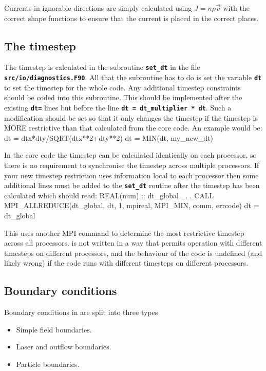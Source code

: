 \documentclass[12pt,a4paper]{article}
\newcommand{\inlinecode}[1]{{\color{warwickred} \bf\texttt{#1}}}
\newcommand{\EPOCH}{{\color{warwickdark}\fontfamily{phv}\selectfont{EPOCH}}}
\newenvironment{boxverbatim}{\lboxverbatim{none}}{\endlboxverbatim}
\begin{document}
Currents in ignorable directions are simply calculated using $J = n\rho\vec{v}$
with the correct shape functions to ensure that the current is placed in the
correct places.

\subsection{The timestep}

The timestep is calculated in the subroutine \inlinecode{set\_dt} in the file
\inlinecode{src/io/diagnostics.F90}. All that the subroutine has to do is set
the variable \inlinecode{dt} to set the timestep for the whole code. Any
additional timestep constraints should be coded into this subroutine. This
should be implemented after the existing \inlinecode{dt=} lines but before the
line \inlinecode{dt = dt\_multiplier * dt}. Such a modification should be set so
that it only changes the timestep if the timestep is MORE restrictive than that
calculated from the core code. An example would be:
\begin{boxverbatim}
   dt = dtx*dty/SQRT(dtx**2+dty**2)
   dt = MIN(dt, my_new_dt)
\end{boxverbatim}

In the core {\EPOCH} code the timestep can be calculated identically on each
processor, so there is no requirement to synchronise the timestep across
multiple processors. If your new timestep restriction uses information local to
each processor then some additional lines must be added to the
\inlinecode{set\_dt} routine after the timestep has been calculated which
should read:
\begin{boxverbatim}
  REAL(num) :: dt_global
          .
          .
          .
  CALL MPI_ALLREDUCE(dt_global, dt, 1, mpireal, MPI_MIN, comm, errcode)
  dt = dt_global
\end{boxverbatim}

This uses another MPI command to determine the most restrictive timestep across
all processors. {\EPOCH} is not written in a way that permits operation with
different timesteps on different processors, and the behaviour of the code is
undefined (and likely wrong) if the code runs with different timesteps on
different processors.

\subsection{Boundary conditions}
Boundary conditions in {\EPOCH} are split into three types
\begin{itemize}
\item Simple field boundaries.
\item Laser and outflow boundaries.
\item Particle boundaries.
\end{itemize}
\end{document}
